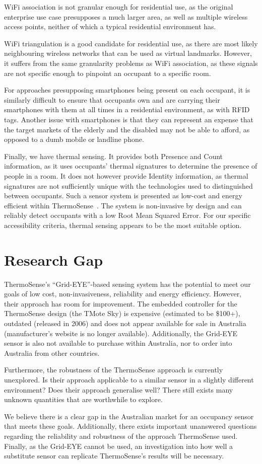 \documentclass[../thesis/thesis.tex]{subfiles}
\begin{document}
WiFi association is not granular enough for residential use, as the original enterprise use case presupposes a much larger area, as well as multiple wireless access points, neither of which a typical residential environment has.

WiFi triangulation is a good candidate for residential use, as there are most likely neighbouring wireless networks that can be used as virtual landmarks. However, it suffers from the same granularity problems as WiFi association, as these signals are not specific enough to pinpoint an occupant to a specific room.

For approaches presupposing smartphones being present on each occupant, it is similarly difficult to ensure that occupants own and are carrying their smartphones with them at all times in a residential environment, as with RFID tags.  Another issue with smartphones is that they can represent an expense that the target markets of the elderly and the disabled may not be able to afford, as opposed to a dumb mobile or landline phone.

Finally, we have thermal sensing. It provides both Presence and Count information, as it uses occupants' thermal signatures to determine the presence of people in a room. It does not however provide Identity information, as thermal signatures are not sufficiently unique with the technologies used to distinguished between occupants. Such a sensor system is presented as low-cost and energy efficient within ThermoSense~\cite{beltran2013thermosense}. The system is non-invasive by design and can reliably detect occupants with a low Root Mean Squared Error. For our specific accessibility criteria, thermal sensing appears to be the most suitable option.

\section{Research Gap}
ThermoSense's ``Grid-EYE''-based sensing system has the potential to meet our goals of low cost, non-invasiveness, reliability and energy efficiency. However, their approach has room for improvement. The embedded controller for the ThermoSense design (the TMote Sky) is expensive (estimated to be \$100+), outdated (released in 2006) and does not appear available for sale in Australia (manufacturer's website is no longer available). Additionally, the Grid-EYE sensor is also not available to purchase within Australia, nor to order into Australia from other countries.

Furthermore, the robustness of the ThermoSense approach is currently unexplored. Is their approach applicable to a similar sensor in a slightly different environment? Does their approach generalise well? There still exists many unknown quantities that are worthwhile to explore.

We believe there is a clear gap in the Australian market for an occupancy sensor that meets these goals. Additionally, there exists important unanswered questions regarding the reliability and robustness of the approach ThermoSense used. Finally, as the Grid-EYE cannot be used, an investigation into how well a substitute sensor can replicate ThermoSense's results will be necessary.

\end{document}
